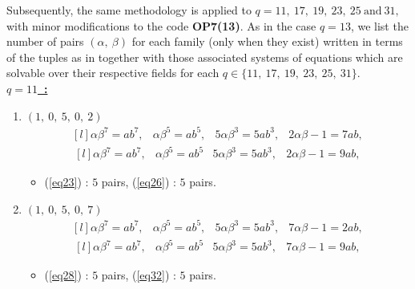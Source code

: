 \documentclass[12pt,a4wide, reqno]{amsart}
\theoremstyle{definition}
\theoremstyle{remark}
\numberwithin{equation}{section}
\begin{document}
Subsequently, the same methodology is applied to $q=11,~17,~19,~23,~25~\text{and}~31,$ with minor modifications to the code \textbf{OP7(13)}. As in the case $q=13$, we list the number of pairs $(\alpha,~\beta)$ for each family (only when they exist) written in terms of the tuples as in   together with those associated systems of equations which are solvable over their respective fields for each $q\in\{11,~17,~19,~23,~25,~31\}.$ 
\vspace{0.3 cm}
\\
\underline{\Large \textbf{$q=11$~:}}
\vspace{0.2cm}
\begin{enumerate}[label=\textbf{(\arabic*)}]
    \item 
    $(1,~0,~5,~0,~2)$ 
\begin{equation}\label{eq23}
    \begin{matrix*}[l]
          \alpha \beta ^7=ab^7, & \alpha \beta ^5=ab^5, & 5\alpha \beta ^3=5ab ^3, & 2\alpha\beta-1=7ab,
    \end{matrix*}
\end{equation}
\begin{equation}\label{eq26}
    \begin{matrix*}[l]
          \alpha \beta ^7=ab^7, & \alpha \beta ^5=ab^5 & 5\alpha \beta ^3=5ab ^3, & 2\alpha\beta-1=9ab,
    \end{matrix*}
\end{equation}

\begin{itemize}
    \item 
    (\ref{eq23}) : $ 5$ pairs, (\ref{eq26}) : $ 5$ pairs.
    \end{itemize}
    \item
$(1,~0,~5,~0,~7)$ 
\begin{equation}\label{eq28}
    \begin{matrix*}[l]
         \alpha \beta ^7=ab^7, & \alpha \beta ^5=ab^5, & 5\alpha \beta ^3=5ab ^3, & 7\alpha\beta-1=2ab,
    \end{matrix*}
\end{equation}
\begin{equation}\label{eq32}
    \begin{matrix*}[l]
          \alpha \beta ^7=ab^7, & \alpha \beta ^5=ab^5 & 5\alpha \beta ^3=5ab ^3, & 7\alpha\beta-1=9ab,
    \end{matrix*}
\end{equation}

\begin{itemize}
    \item 
    (\ref{eq28}) : $5$ pairs,  (\ref{eq32}) : $5$ pairs.
    

\end{itemize}
\end{enumerate}
\end{document}
